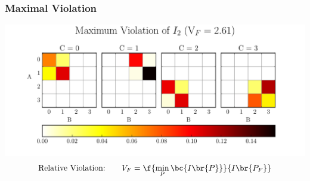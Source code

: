\documentclass[
    hyperref={bookmarks=false},%
    xcolor={dvipsnames},
]{beamer}
\begin{document}
\begin{frame}
    \frametitle{Maximal Violation}
    \includegraphics[width=\linewidth]{../../figures/distributions/plotted_dist_I_2_max_violation.pdf}
    \[ \text{Relative Violation:} \qquad V_F = \f{\min_P\bc{I\br{P}}}{I\br{P_F}} \]
\end{frame}
\end{document}
